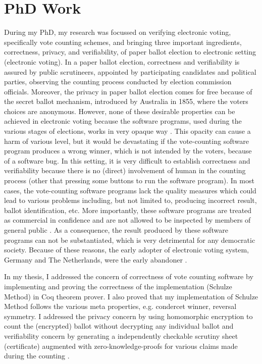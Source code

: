 \documentclass[a4paper]{article}
\begin{document}
\section{PhD Work}
During my PhD, my research was focussed on verifying electronic voting, specifically vote counting schemes, 
and bringing  three important ingredients, correctness, 
privacy, and verifiability, of paper ballot election to electronic setting (electronic voting). In a paper ballot election, correctness and verifiability is
assured by public scrutineers, appointed by participating candidates and political parties, observing the counting process conducted by 
election commission officials. Moreover, the privacy in paper ballot election comes for free because of the secret ballot mechanism, introduced 
by Australia in 1855, where the voters choices are anonymous. However, none of 
these desirable properties can be achieved in electronic voting because the software programs, used during the 
various stages of  elections, works in very opaque way \cite{Wolchok:2010:SAI:1866307.1866309, 10.1007/978-3-319-22270-7_3}.
 This opacity can cause a harm of various level, but 
it would be devastating if the vote-counting 
software program produces a wrong winner, which is not intended by the voters, because of a software bug. 
In this setting, it is very difficult to 
establish correctness and verifiability because there is no (direct) involvement of human in the counting process (other 
that pressing some buttons to run the software program).  
In most cases, the vote-counting software programs lack the quality measures which could lead to various 
problems including, but not limited to,  producing incorrect result, ballot identification, etc.  More importantly, these software programs
are treated as commercial in confidence and are not allowed to be inspected by members of general public \cite{AEC:2013:LMM}. 
As a consequence, the result produced by these software programs can not be substantiated, which is very detrimental 
for any democratic society. Because of these reasons, the early adopter of electronic 
voting system, Germany and The Netherlands, were the early abandoner \cite{Jacobs2009}. 

In my thesis, I addressed the concern of correctness of vote counting 
software by implementing  and proving the correctness of the implementation (Schulze Method) in Coq theorem prover. 
I also proved that my implementation of Schulze Method follows the various meta properties, e.g. condercet winner, reversal symmetry.
I addressed the privacy concern by using homomorphic encryption to count the (encrypted) ballot without decrypting 
any individual ballot and  verifiability concern by generating a independently checkable scrutiny sheet (certificate) 
augmented with zero-knowledge-proofs for various claims made during the counting \cite{10.1007/978-3-030-41600-3_4, 10.1145/3319535.3354247}. 
\end{document}
